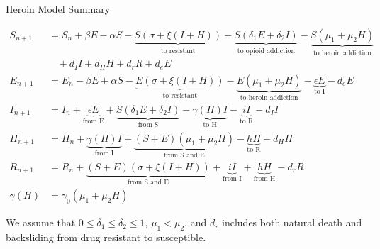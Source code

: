 \documentclass[11pt]{report}
\begin{document}
\begin{center}
{\Huge Heroin Model Summary}\\	
\end{center}
\vspace{1in}

\begin{align*}
	S_{n+1} &= S_n + \beta E - \alpha S - \underbrace{S(\sigma + \xi(I+H))}_{\text{to resistant}} - \underbrace{S(\delta_1 E + \delta_2 I)}_{\text{to opioid addiction}} - \underbrace{S(\mu_1+\mu_2H)}_{\text{to heroin addiction}}\\
	&\ \ \ \ + d_I I + d_H H + d_r R + d_e E\\
	E_{n+1} &= E_n - \beta E + \alpha S - \underbrace{E(\sigma + \xi(I+H))}_{\text{to resistant}} - \underbrace{E(\mu_1 + \mu_2H)}_{\text{to heroin addiction}} - \underbrace{\epsilon E}_{\text{to I}} - d_e E\\
	I_{n+1} &= I_n + \underbrace{\epsilon E}_{\text{from E}} + \underbrace{S(\delta_1E+\delta_2I)}_{\text{from S}} - \underbrace{\gamma(H)I}_{\text{to H}} - \underbrace{iI}_{\text{to R}} - d_II\\
	H_{n+1} &= H_n + \underbrace{\gamma(H)I}_{\text{from I}} + \underbrace{(S+E)(\mu_1+\mu_2H)}_{\text{from S and E}} - \underbrace{hH}_{\text{to R}} - d_HH\\
	R_{n+1} &= R_n + \underbrace{(S+E)(\sigma + \xi(I+H))}_{\text{from S and E}} + \underbrace{iI}_{\text{from I}} + \underbrace{hH}_{\text{from H}} -d_rR\\
	\gamma(H) &= \gamma_0(\mu_1+\mu_2H)
\end{align*}

We assume that $0\leq\delta_1\leq\delta_2\leq 1$, $\mu_1<\mu_2$, and $d_r$ includes both natural death and backsliding from drug resistant to susceptible.
\end{document}
